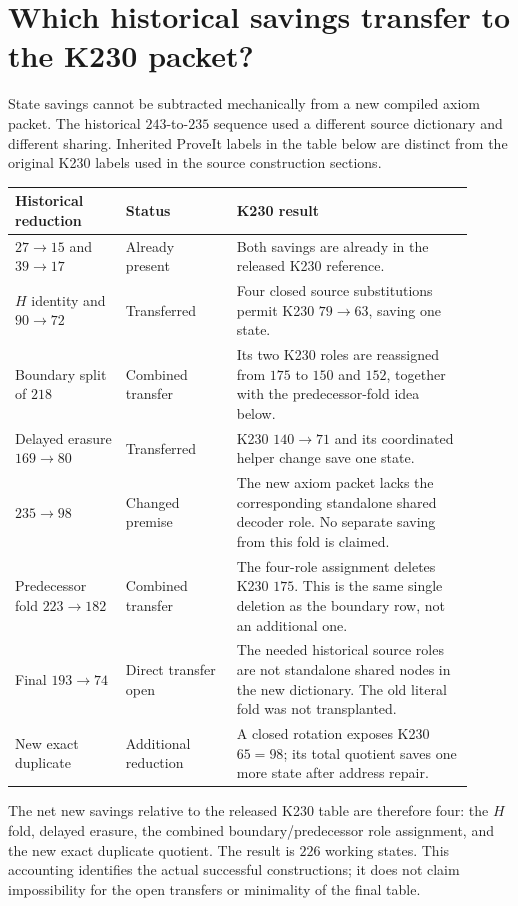 \section{Which historical savings transfer to the K230 packet?}
\label{sec:transfer-accounting}

State savings cannot be subtracted mechanically from a new compiled axiom
packet.  The historical $243$-to-$235$ sequence used a different source
dictionary and different sharing.  Inherited ProveIt labels in the table
below are distinct from the original K230 labels used in the source
construction sections.

\begin{center}\small
\begin{tabular}{p{0.22\linewidth}p{0.22\linewidth}p{0.47\linewidth}}
Historical reduction & Status & K230 result\\
\hline
$27\to15$ and $39\to17$ & Already present &
Both savings are already in the released K230 reference.\\[3pt]
$H$ identity and $90\to72$ & Transferred &
Four closed source substitutions permit K230 $79\to63$, saving one state.\\[3pt]
Boundary split of $218$ & Combined transfer &
Its two K230 roles are reassigned from $175$ to $150$ and $152$,
together with the predecessor-fold idea below.\\[3pt]
Delayed erasure $169\to80$ & Transferred &
K230 $140\to71$ and its coordinated helper change save one state.\\[3pt]
$235\to98$ & Changed premise &
The new axiom packet lacks the corresponding standalone shared decoder
role.  No separate saving from this fold is claimed.\\[3pt]
Predecessor fold $223\to182$ & Combined transfer &
The four-role assignment deletes K230 $175$.  This is the same single
deletion as the boundary row, not an additional one.\\[3pt]
Final $193\to74$ & Direct transfer open &
The needed historical source roles are not standalone shared nodes in
the new dictionary.  The old literal fold was not transplanted.\\[3pt]
New exact duplicate & Additional reduction &
A closed rotation exposes K230 $65=98$; its total quotient saves one
more state after address repair.
\end{tabular}
\end{center}

The net new savings relative to the released K230 table are therefore
four: the $H$ fold, delayed erasure, the combined boundary/predecessor
role assignment, and the new exact duplicate quotient.  The result is
$226$ working states.  This accounting identifies the actual successful
constructions; it does not claim impossibility for the open transfers
or minimality of the final table.
